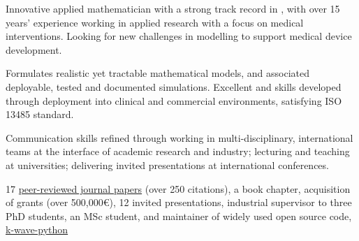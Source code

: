 \documentclass[english, print]{cv-style-wide}
\begin{document}

%
\setul{0.5ex}{0.4pt}%
Innovative applied mathematician with a strong track record in , with over 15 years' experience working in applied research with a focus on medical interventions. Looking for new challenges in modelling to support medical device development.
  \begin{NoHyphItemize}
    \item Formulates realistic yet tractable mathematical models, and associated deployable, tested and documented simulations.  Excellent  and  skills developed through deployment into clinical and commercial environments, satisfying ISO 13485 standard.  
    \item Communication skills refined through working in multi-disciplinary, international teams at the interface of academic research and industry; lecturing and teaching at universities; delivering invited presentations at international conferences. %
    \item 17 \href{https://scholar.google.co.uk/citations?user=lauJqakAAAAJ&hl=en}{peer-reviewed journal papers} (over 250 citations), a book chapter, acquisition of grants (over 500,000\euro), 12 invited presentations, industrial supervisor to three PhD students, an MSc student, and maintainer of widely used open source code, \href{https://k-wave-python.readthedocs.io/en/latest/index.html#citation}{\ul{k-wave-python}}
  \end{NoHyphItemize}
  
\end{document}
